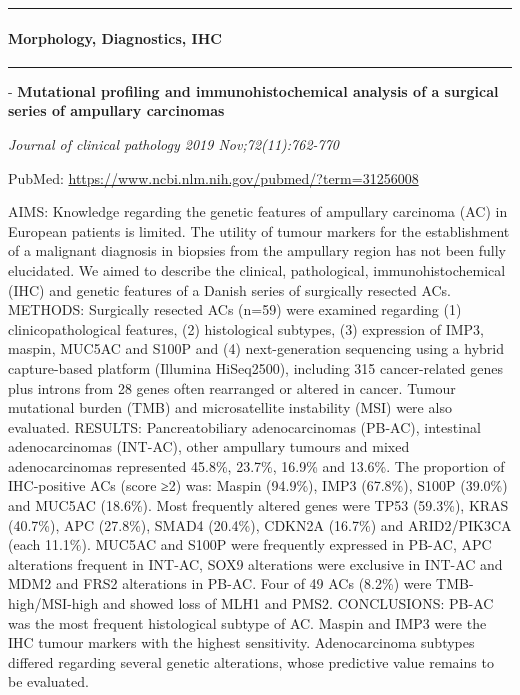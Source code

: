\documentclass[
]{article}
\renewcommand{\linethickness}{0.05em}
\begin{document}
\begin{center}\rule{0.5\linewidth}{\linethickness}\end{center}

\hypertarget{ampullavater_morphology}{%
\paragraph{Morphology, Diagnostics, IHC}\label{ampullavater_morphology}}

\begin{center}\rule{0.5\linewidth}{\linethickness}\end{center}

- \textbf{Mutational profiling and immunohistochemical analysis of a
surgical series of ampullary carcinomas}

\emph{Journal of clinical pathology 2019 Nov;72(11):762-770}

PubMed: \url{https://www.ncbi.nlm.nih.gov/pubmed/?term=31256008}

AIMS: Knowledge regarding the genetic features of ampullary carcinoma
(AC) in European patients is limited. The utility of tumour markers for
the establishment of a malignant diagnosis in biopsies from the
ampullary region has not been fully elucidated. We aimed to describe the
clinical, pathological, immunohistochemical (IHC) and genetic features
of a Danish series of surgically resected ACs. METHODS: Surgically
resected ACs (n=59) were examined regarding (1) clinicopathological
features, (2) histological subtypes, (3) expression of IMP3, maspin,
MUC5AC and S100P and (4) next-generation sequencing using a hybrid
capture-based platform (Illumina HiSeq2500), including 315
cancer-related genes plus introns from 28 genes often rearranged or
altered in cancer. Tumour mutational burden (TMB) and microsatellite
instability (MSI) were also evaluated. RESULTS: Pancreatobiliary
adenocarcinomas (PB-AC), intestinal adenocarcinomas (INT-AC), other
ampullary tumours and mixed adenocarcinomas represented 45.8\%, 23.7\%,
16.9\% and 13.6\%. The proportion of IHC-positive ACs (score ≥2) was:
Maspin (94.9\%), IMP3 (67.8\%), S100P (39.0\%) and MUC5AC (18.6\%). Most
frequently altered genes were TP53 (59.3\%), KRAS (40.7\%), APC
(27.8\%), SMAD4 (20.4\%), CDKN2A (16.7\%) and ARID2/PIK3CA (each
11.1\%). MUC5AC and S100P were frequently expressed in PB-AC, APC
alterations frequent in INT-AC, SOX9 alterations were exclusive in
INT-AC and MDM2 and FRS2 alterations in PB-AC. Four of 49 ACs (8.2\%)
were TMB-high/MSI-high and showed loss of MLH1 and PMS2. CONCLUSIONS:
PB-AC was the most frequent histological subtype of AC. Maspin and IMP3
were the IHC tumour markers with the highest sensitivity. Adenocarcinoma
subtypes differed regarding several genetic alterations, whose
predictive value remains to be evaluated.
\end{document}
